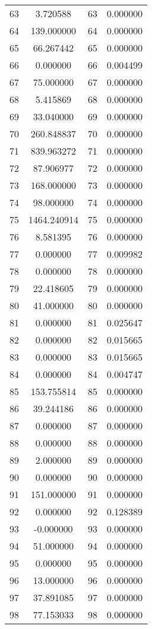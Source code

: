 \documentclass[12pt]{article}
\begin{document}
\begin{longtable}{@{}cccc@{}}
63 & 3.720588 & 63 & 0.000000 \\
64 & 139.000000 & 64 & 0.000000 \\
65 & 66.267442 & 65 & 0.000000 \\
66 & 0.000000 & 66 & 0.004499 \\
67 & 75.000000 & 67 & 0.000000 \\
68 & 5.415869 & 68 & 0.000000 \\
69 & 33.040000 & 69 & 0.000000 \\
70 & 260.848837 & 70 & 0.000000 \\
71 & 839.963272 & 71 & 0.000000 \\
72 & 87.906977 & 72 & 0.000000 \\
73 & 168.000000 & 73 & 0.000000 \\
74 & 98.000000 & 74 & 0.000000 \\
75 & 1464.240914 & 75 & 0.000000 \\
76 & 8.581395 & 76 & 0.000000 \\
77 & 0.000000 & 77 & 0.009982 \\
78 & 0.000000 & 78 & 0.000000 \\
79 & 22.418605 & 79 & 0.000000 \\
80 & 41.000000 & 80 & 0.000000 \\
81 & 0.000000 & 81 & 0.025647 \\
82 & 0.000000 & 82 & 0.015665 \\
83 & 0.000000 & 83 & 0.015665 \\
84 & 0.000000 & 84 & 0.004747 \\
85 & 153.755814 & 85 & 0.000000 \\
86 & 39.244186 & 86 & 0.000000 \\
87 & 0.000000 & 87 & 0.000000 \\
88 & 0.000000 & 88 & 0.000000 \\
89 & 2.000000 & 89 & 0.000000 \\
90 & 0.000000 & 90 & 0.000000 \\
91 & 151.000000 & 91 & 0.000000 \\
92 & 0.000000 & 92 & 0.128389 \\
93 & -0.000000 & 93 & 0.000000 \\
94 & 51.000000 & 94 & 0.000000 \\
95 & 0.000000 & 95 & 0.000000 \\
96 & 13.000000 & 96 & 0.000000 \\
97 & 37.891085 & 97 & 0.000000 \\
98 & 77.153033 & 98 & 0.000000 \\

\end{longtable}
\end{document}

